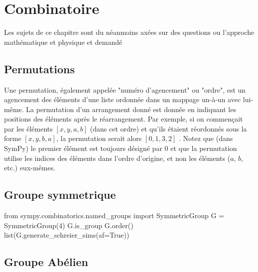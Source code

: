 \part{Combinatoire}

Les sujets de ce chapitre sont du néanmoins axées sur des questions ou l'approche mathématique et 
physique et demandé 

\chapter{Permutations}
Une permutation, également appelée "numéro d'agencement" ou "ordre", est un agencement des éléments d'une liste ordonnée dans un mappage un-à-un avec lui-même. La permutation d'un arrangement donné est donnée en indiquant les positions des éléments après le réarrangement. Par exemple, si on commençait par les éléments $\left[x, y, a, b\right]$ (dans cet ordre) et qu'ils étaient réordonnés sous la forme $\left[x, y, b, a\right]$, la permutation serait alors $\left[0, 1, 3, 2\right]$ . Notez que (dans SymPy) le premier élément est toujours désigné par $0$ et que la permutation utilise les indices des éléments dans l'ordre d'origine, et non les éléments ($a$, $b$, etc.) eux-mêmes.
\chapter{Groupe symmetrique}

 \begin{python}
  from sympy.combinatorics.named_groups import SymmetricGroup
  G = SymmetricGroup(4)
  G.is_group
  G.order()
  list(G.generate_schreier_sims(af=True))
 \end{python}
\chapter{Groupe Abélien}
